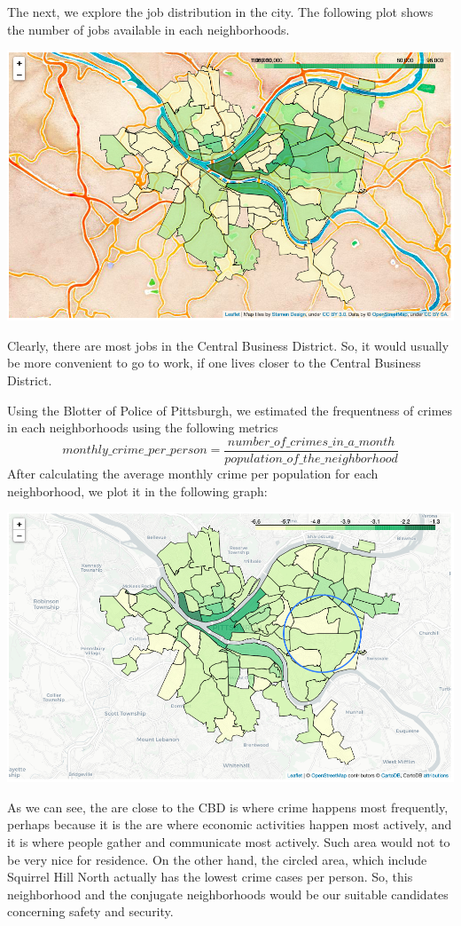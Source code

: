 \documentclass[11pt,notitlepage]{article}
\begin{document}
The next, we explore the job distribution in the city.
The following plot shows the number of jobs available
in each neighborhoods.
\begin{center}
    \includegraphics[scale=0.35]{job_distribution.png}
\end{center}
Clearly, there are most jobs in the Central Business District.
So, it would usually be more convenient to go to work,
if one lives closer to the Central Business District.

Using the Blotter of Police of Pittsburgh, we estimated
the frequentness of crimes in each neighborhoods using
the following metrics
\[monthly\_crime\_per\_person =
\frac{number\_of\_crimes\_in\_a\_month}{population\_of\_the\_neighborhood}\]
After calculating the average monthly crime per population for each
neighborhood, we plot it in the following graph:
\begin{center}
    \includegraphics[scale=0.35]{crime.png}
\end{center}
As we can see, the are close to the CBD is where crime happens
most frequently, perhaps because it is the are where economic activities
happen most actively, and it is where people gather and communicate
most actively. Such area would not to be very nice for residence.
On the other hand, the circled area, which include Squirrel Hill North
actually has the lowest crime cases per person.
So, this neighborhood and the conjugate neighborhoods would be our
suitable candidates concerning safety and security.
\end{document}
